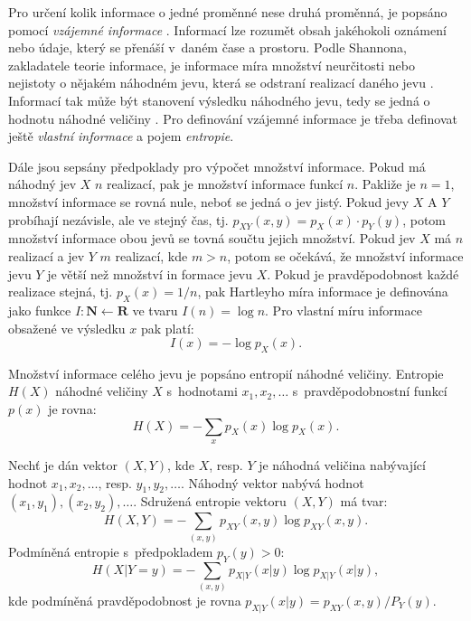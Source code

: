 Pro určení kolik informace o jedné proměnné nese druhá proměnná, je popsáno
pomocí \emph{ vzájemné informace} \cite{bib:MI}. Informací lze rozumět obsah jakéhokoli oznámení nebo údaje, který se přenáší v~daném čase a prostoru. Podle Shannona, zakladatele teorie informace, je informace míra množství neurčitosti nebo nejistoty o nějakém náhodném jevu, která se odstraní realizací daného jevu \cite{bib:MI2}. Informací tak může být stanovení výsledku náhodného jevu, tedy se jedná o hodnotu náhodné veličiny \cite{bib:MI}. Pro definování vzájemné informace je třeba definovat ještě \emph{vlastní informace} a pojem \emph{entropie}.

Dále jsou sepsány předpoklady pro výpočet množství informace. Pokud má náhodný jev $X$ $n$ realizací, pak je množství informace funkcí $n$. Pakliže je $n=1$, množství informace se rovná nule, neboť se jedná o jev jistý. 
Pokud jevy $X$ A $Y$ probíhají nezávisle, ale ve stejný čas, tj. $p_{XY}(x,y)=p_X(x)\cdot p_Y(y)$, potom množství informace obou jevů se tovná součtu jejich množství.
Pokud jev $X$ má $n $ realizací a jev $Y$ $m$ realizací, kde $m>n$, potom se očekává, že množství informace jevu $Y$ je větší než množství in
formace jevu $X$. \cite{bib:MI2} Pokud je pravděpodobnost každé realizace stejná, tj. $p_X(x) = 1/n$, pak  Hartleyho míra informace je definována jako funkce $I: \mathbf{N} \leftarrow \mathbf{R}$ ve tvaru $I(n)=\log n$. Pro vlastní míru informace obsažené ve výsledku $x$ pak platí: \cite{bib:MI2, bib:MI3}
 \begin{equation}
    I(x)=- \log p_{X}(x).
 \end{equation}

Množství informace celého jevu je popsáno entropií náhodné veličiny. Entropie $H(X)$ náhodné veličiny $X$ s~hodnotami $x_1, x_2, \ldots $ s~pravděpodobnostní funkcí $p(x)$ je rovna: \cite{bib:MI2,bib:literatura}
 \begin{equation}
    H(X) = -\sum_x p_{X}(x) \log p_{X}(x).
 \end{equation}

Nechť je dán vektor $(X,Y)$, kde $X$, resp. $Y$ je náhodná veličina nabývající hodnot $x_1, x_2, \ldots $, resp. $y_1, y_2, \ldots$. Náhodný vektor nabývá hodnot $(x_1, y_1), (x_2, y_2), \ldots $. Sdružená entropie vektoru  $(X,Y)$ má tvar: \cite{bib:MI,bib:MI3}
\begin{equation}
    H(X,Y) = -\sum_{(x,y)} p_{XY}(x,y) \log p_{XY}(x,y).
 \end{equation}
Podmíněná entropie s~předpokladem $p_Y(y)>0$: \cite{bib:MI3}
\begin{equation}
    H(X|Y=y) = -\sum_{(x,y)} p_{X|Y}(x|y) \log p_{X|Y}(x|y),
    \label{eq:podmEntropie}
 \end{equation}
kde podmíněná pravděpodobnost je rovna $p_{X|Y}(x|y) = p_{XY}(x,y) / P_Y(y)$.

